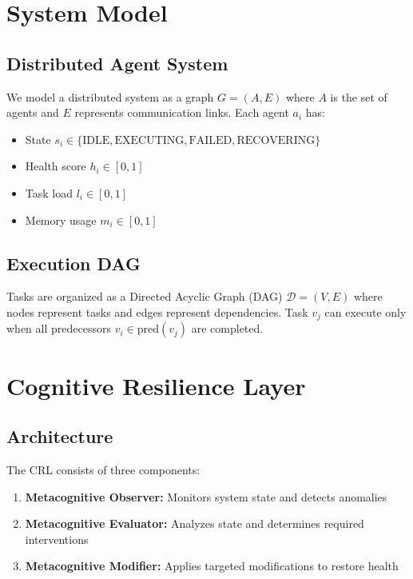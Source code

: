 \documentclass[sigconf]{acmart}
\begin{document}
\section{System Model}

\subsection{Distributed Agent System}

We model a distributed system as a graph $G = (A, E)$ where $A$ is the set of agents and $E$ represents communication links. Each agent $a_i$ has:
\begin{itemize}
\item State $s_i \in \{\text{IDLE}, \text{EXECUTING}, \text{FAILED}, \text{RECOVERING}\}$
\item Health score $h_i \in [0, 1]$
\item Task load $l_i \in [0, 1]$
\item Memory usage $m_i \in [0, 1]$
\end{itemize}

\subsection{Execution DAG}

Tasks are organized as a Directed Acyclic Graph (DAG) $\mathcal{D} = (V, E)$ where nodes represent tasks and edges represent dependencies. Task $v_j$ can execute only when all predecessors $v_i \in \text{pred}(v_j)$ are completed.

\section{Cognitive Resilience Layer}

\subsection{Architecture}

The CRL consists of three components:
\begin{enumerate}
\item \textbf{Metacognitive Observer:} Monitors system state and detects anomalies
\item \textbf{Metacognitive Evaluator:} Analyzes state and determines required interventions
\item \textbf{Metacognitive Modifier:} Applies targeted modifications to restore health
\end{enumerate}
\end{document}
